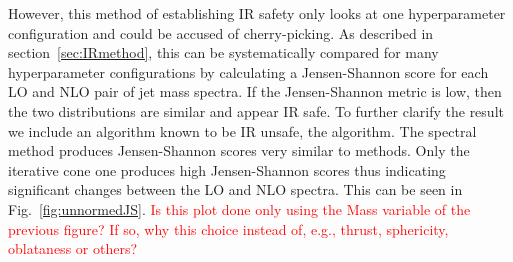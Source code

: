 \begin{figure}[htp]
\end{figure}    

%
%
However, this method of establishing IR safety only looks at one hyperparameter configuration and could be accused of cherry-picking.
As described in section~\ref{sec:IRmethod}, this can be systematically compared for many hyperparameter configurations by calculating a Jensen-Shannon
score for each LO and NLO pair of jet mass spectra.
If the Jensen-Shannon metric is low, then the two distributions are similar and appear IR safe.
To further clarify the result we include an algorithm known to be IR unsafe, the \itercone{} algorithm.
The spectral method produces Jensen-Shannon scores very similar to \genkt{} methods. Only the iterative cone one produces high Jensen-Shannon scores thus indicating significant changes between the LO and NLO spectra.
This can be seen in Fig.~\ref{fig:unnormedJS}. {\textcolor{red}{Is this plot done only using the Mass variable of the previous figure? If so, why this choice instead of, e.g., thrust, sphericity, oblataness or others?}}

